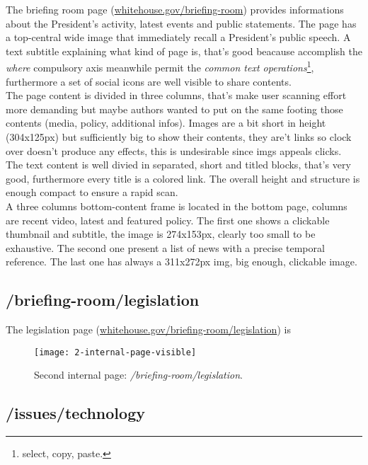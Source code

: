 \documentclass[
12pt, %
a4paper, %
oneside, %
headinclude,footinclude, %
BCOR5mm, %
]{scrartcl}
\begin{document}
	The briefing room page (\href{http://www.whitehouse.gov/briefing-room}{whitehouse.gov/briefing-room}) provides informations about the President's activity, latest events and public statements. The page has a top-central wide image that immediately recall a President's public speech. A text subtitle explaining what kind of page is, that's good beacause accomplish the \emph{where} compulsory axis meanwhile permit the \emph{common text operations}\footnote{select, copy, paste.}, furthermore a set of social icons are well visible to share contents. \\
	The page content is divided in three columns, that's make user scanning effort more demanding but maybe authors wanted to put on the same footing those contents (media, policy, additional infos). Images are a bit short in height (304x125px) but sufficiently big to show their contents, they are't links so clock over doesn't produce any effects, this is undesirable since imgs appeals clicks. \\
	The text content is well divied in separated, short and titled blocks, that's very good, furthermore every title is a colored link. The overall height and structure is enough compact to ensure a rapid scan. \\
	A three columns bottom-content frame is located in the bottom page, columns are recent video, latest and featured policy. The first one shows a clickable thumbnail and subtitle, the image is 274x153px, clearly too small to be exhaustive. The second one present a list of news with a precise temporal reference. The last one has always a 311x272px img, big enough, clickable image.

	\newpage
	\subsection{/briefing-room/legislation}
	
	The legislation page (\href{http://www.whitehouse.gov/briefing-room/legislation}{whitehouse.gov/briefing-room/legislation}) is 

	\begin{figure}[h!]
	\centering 
	\centerline{\texttt{[image: 2-internal-page-visible]}}
	\caption[Second internal page: /briefing-room/legislation]{Second internal page: \emph{/briefing-room/legislation}.}
	\label{fig:secondapaginainterna} 
	\end{figure}

	

	\subsection{/issues/technology}
	
\end{document}
